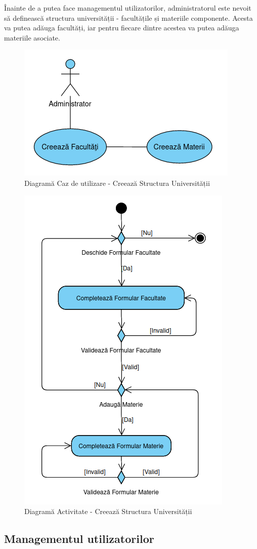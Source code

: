 \documentclass[12pt, a4paper, oneside, romanian]{teza-upb}
\begin{document}
Înainte de a putea face managementul utilizatorilor, administratorul este nevoit să definească structura universității - facultățile și materiile componente. Acesta va putea adăuga facultăți, iar pentru fiecare dintre acestea va putea adăuga materiile asociate.

\begin{figure}[H]
\centering
\includegraphics*[width=0.5\columnwidth]{diagrama-use-case-creeaza-structura-universitatii}
\caption{Diagramă Caz de utilizare - Creează Structura Universității}
\label{diagrama-use-case-creeaza-structura-universitatii}
\end{figure}


\begin{figure}[H]
\centering
\includegraphics*[width=0.5\columnwidth]{diagrama-activitate-creeaza-structura-universitatii}
\caption{Diagramă Activitate - Creează Structura Universității}
\label{diagrama-activitate-creeaza-structura-universitatii}
\end{figure}

\subsection{Managementul utilizatorilor}
\end{document}

